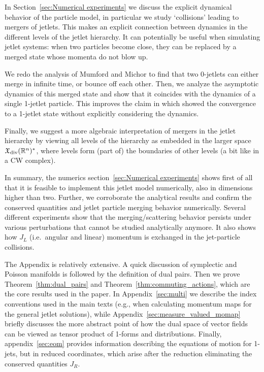 \documentclass[12pt]{amsart}
\begin{document}
In Section~\ref{sec:Numerical experiments} we discuss the explicit dynamical behavior of the
particle model, in particular we study `collisions' leading to mergers of jetlets.
This makes an explicit connection between dynamics in the different
levels of the jetlet hierarchy. It can potentially be useful when
simulating jetlet systems: when two particles become close, they
can be replaced by a merged state whose momenta do not blow up.

We redo the analysis of Mumford and Michor to find that two 0-jetlets
can either merge in infinite time, or bounce off each other.
Then, we analyze the asymptotic dynamics of this merged state and show
that it coincides with the dynamics of a single 1-jetlet particle. This
improves the claim in \cite{CotterHolmJacobsMeier2014} which showed the
convergence to a 1-jetlet state without explicitly considering the dynamics.

Finally, we suggest a more algebraic interpretation of mergers in
the jetlet hierarchy by viewing all levels of the hierarchy as embedded
in the larger space $\mathfrak{X}_{\rm div}(\mathbb{R}^n)^*$, where levels form (part of) the
boundaries of other levels (a bit like in a CW complex).

In summary, the numerics section~\ref{sec:Numerical experiments} shows first of all that it is feasible to implement this jetlet model numerically, also in dimensions higher than
two. Further, we corroborate the analytical results and confirm the
conserved quantities and jetlet particle merging behavior numerically.
Several different experiments show that the merging/scattering behavior persists
under various perturbations that cannot be studied analytically anymore.
It also shows how $J_L$ (i.e.\ angular and linear) momentum is exchanged
in the jet-particle collisions.



The Appendix is relatively extensive. A quick discussion of symplectic and Poisson manifolds is followed by the definition of dual pairs. Then we prove Theorem~\ref{thm:dual_pairs} and Theorem~\ref{thm:commuting_actions}, which are the core results used in the paper. In Appendix~\ref{sec:multi} we describe the index conventions used in the main texts (e.g., when calculating momentum maps for the general jetlet solutions), while Appendix~\ref{sec:measure_valued_momap} briefly discusses the more abstract point of how the dual space of vector fields can be viewed as tensor product of 1-forms and distributions.
Finally, appendix~\ref{sec:eom} provides information describing the equations of motion for 1-jets, but in reduced coordinates, which arise after the reduction eliminating the conserved quantities $J_R$.
\end{document}
